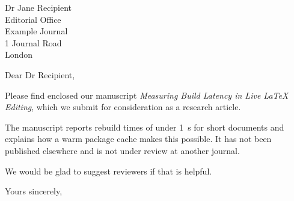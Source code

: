 \documentclass[11pt]{letter}
\date{\today}
\begin{document}
\begin{letter}{Dr Jane Recipient \\ Editorial Office \\ Example Journal \\ 1 Journal Road \\ London}

\opening{Dear Dr Recipient,}

Please find enclosed our manuscript \emph{Measuring Build Latency in Live \LaTeX{} Editing}, which we submit for consideration as a research article.

The manuscript reports rebuild times of under \SI{1}{\second} for short documents and explains how a warm package cache makes this possible.
It has not been published elsewhere and is not under review at another journal.

We would be glad to suggest reviewers if that is helpful.

\closing{Yours sincerely,}


\end{letter}
\end{document}
